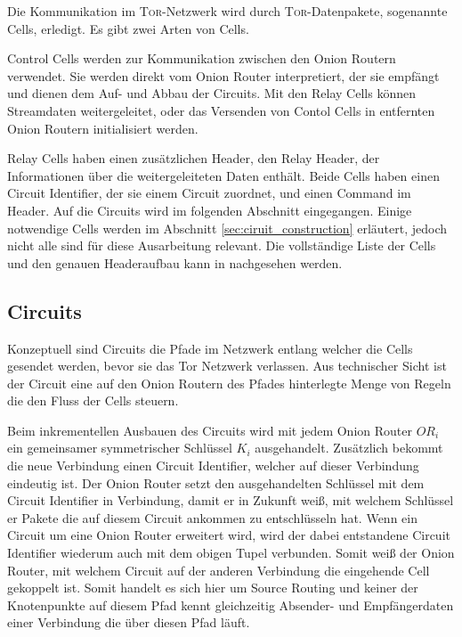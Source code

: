 \documentclass[fleqn,envcountsame,runningheads,10pt,a4paper]{llncs}
\begin{document}
Die Kommunikation im \textsc{Tor}-Netzwerk wird durch \textsc{Tor}-Datenpakete, sogenannte Cells, erledigt. Es gibt zwei Arten von Cells. 

Control Cells werden zur Kommunikation zwischen den Onion Routern verwendet. Sie werden direkt vom Onion Router interpretiert, der sie empfängt und dienen dem Auf- und Abbau der Circuits. Mit den Relay Cells können Streamdaten weitergeleitet, oder das Versenden von Contol Cells in entfernten Onion Routern initialisiert werden.

Relay Cells haben einen zusätzlichen Header, den Relay Header, der Informationen über die weitergeleiteten Daten enthält. Beide Cells haben einen Circuit Identifier, der sie einem Circuit zuordnet, und einen Command im Header. Auf die Circuits wird im folgenden Abschnitt eingegangen. Einige notwendige Cells werden im Abschnitt \ref{sec:ciruit_construction} erläutert, jedoch nicht alle sind für diese Ausarbeitung relevant. Die vollständige Liste der Cells und den genauen Headeraufbau kann in \cite{tor} nachgesehen werden.

\subsection{Circuits}

Konzeptuell sind Circuits die Pfade im Netzwerk entlang welcher die Cells gesendet werden, bevor sie das Tor Netzwerk verlassen. Aus technischer Sicht ist der Circuit eine auf den Onion Routern des Pfades hinterlegte Menge von Regeln die den Fluss der Cells steuern.

\newpage Beim inkrementellen Ausbauen des Circuits wird mit jedem Onion Router $\textit{OR}_i$ ein gemeinsamer symmetrischer Schlüssel $\textit{K}_i$ ausgehandelt. Zusätzlich bekommt die neue Verbindung einen Circuit Identifier, welcher auf dieser Verbindung eindeutig ist. Der Onion Router setzt den ausgehandelten Schlüssel mit dem Circuit Identifier in Verbindung, damit er in Zukunft weiß, mit welchem Schlüssel er Pakete die auf diesem Circuit ankommen zu entschlüsseln hat. Wenn ein Circuit um eine Onion Router erweitert wird, wird der dabei entstandene Circuit Identifier wiederum auch mit dem obigen Tupel verbunden. Somit weiß der Onion Router, mit welchem Circuit auf der anderen Verbindung die eingehende Cell gekoppelt ist. Somit handelt es sich hier um Source Routing und keiner der Knotenpunkte auf diesem Pfad kennt gleichzeitig Absender- und Empfängerdaten einer Verbindung die über diesen Pfad läuft. 
\end{document}
